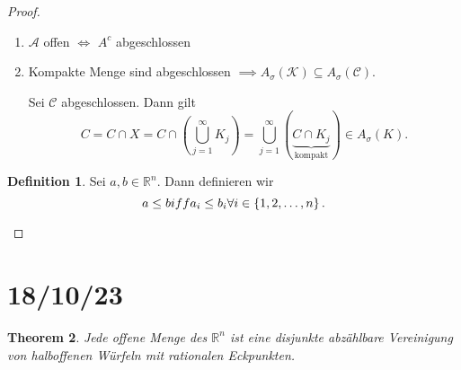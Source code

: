 \documentclass[prb,12pt]{revtex4-2}
\newtheorem{Theorem}{Theorem}
\theoremstyle{definition}
\theoremstyle{definition}
\newtheorem{Definition}[Theorem]{Definition}
\newcommand{\R}{\mathbb{R}}
\begin{document}
\begin{proof}
\begin{enumerate}
	\item $\mathcal{A}$ offen $\iff$ $A^c$ abgeschlossen
	\item Kompakte Menge sind abgeschlossen $\implies A_\sigma(\mathcal{K})\subseteq A_\sigma(\mathcal{C})$.

		Sei $\mathcal{C}$ abgeschlossen. Dann gilt 
		\[
			C=C\cap X=C\cap \left( \bigcup_{j=1} ^\infty K_j \right) =\bigcup_{j=1} ^\infty\left( \underbrace{C\cap K_j}_\text{kompakt} \right) \in A_\sigma(K)
		.\] 
\end{enumerate}

\begin{Definition}
	Sei $a,b\in \R^n$. Dann definieren wir
	\[
	a\le b\\iff a_i \le b_i \forall i\in \left\{ 1,2,\dots, n \right\} 
	.\] 
\end{Definition}
\end{proof}

\section{18/10/23}
\begin{Theorem}
	 Jede offene Menge des $\R^n$ ist eine disjunkte abzählbare Vereinigung von halboffenen Würfeln mit rationalen Eckpunkten.
\end{Theorem}
\end{document}
